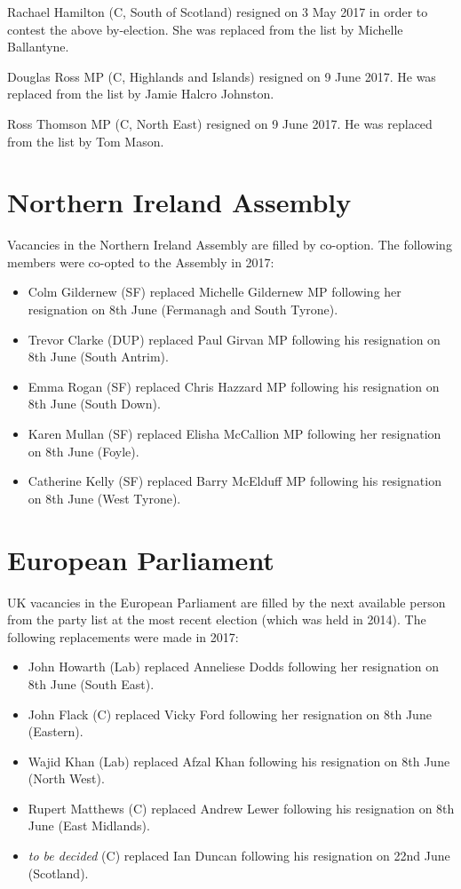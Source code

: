 \documentclass[a4paper,openany]{book}
\begin{document}
Rachael Hamilton (C, South of Scotland) resigned on 3 May 2017 in order to contest the above by-election.  She was replaced from the list by Michelle Ballantyne.

Douglas Ross MP (C, Highlands and Islands) resigned on 9 June 2017.  He was replaced from the list by Jamie Halcro Johnston.

Ross Thomson MP (C, North East) resigned on 9 June 2017.  He was replaced from the list by Tom Mason.

\section{Northern Ireland Assembly}

Vacancies in the Northern Ireland Assembly are filled by co-option.
%
The following members were co-opted to the Assembly in 2017:
\begin{itemize}
\item Colm Gildernew (SF) replaced Michelle Gildernew MP following her resignation on 8th June (Fermanagh and South Tyrone).
\item Trevor Clarke (DUP) replaced Paul Girvan MP following his resignation on 8th June (South Antrim).
\item Emma Rogan (SF) replaced Chris Hazzard MP following his resignation on 8th June (South Down).
\item Karen Mullan (SF) replaced Elisha McCallion MP following her resignation on 8th June (Foyle).
\item Catherine Kelly (SF) replaced Barry McElduff MP following his resignation on 8th June (West Tyrone).
\end{itemize}

\section{European Parliament}

UK vacancies in the European Parliament are filled by the next available person from the party list at the most recent election (which was held in 2014). 
The following replacements were made in 2017:
\begin{itemize}
\item John Howarth (Lab) replaced Anneliese Dodds following her resignation on 8th June (South East).
\item John Flack (C) replaced Vicky Ford following her resignation on 8th June (Eastern).
\item Wajid Khan (Lab) replaced Afzal Khan following his resignation on 8th June (North West).
\item Rupert Matthews (C) replaced Andrew Lewer following his resignation on 8th June (East Midlands).
\item \emph{to be decided} (C) replaced Ian Duncan following his resignation on 22nd June (Scotland).
\end{itemize}
\end{document}
